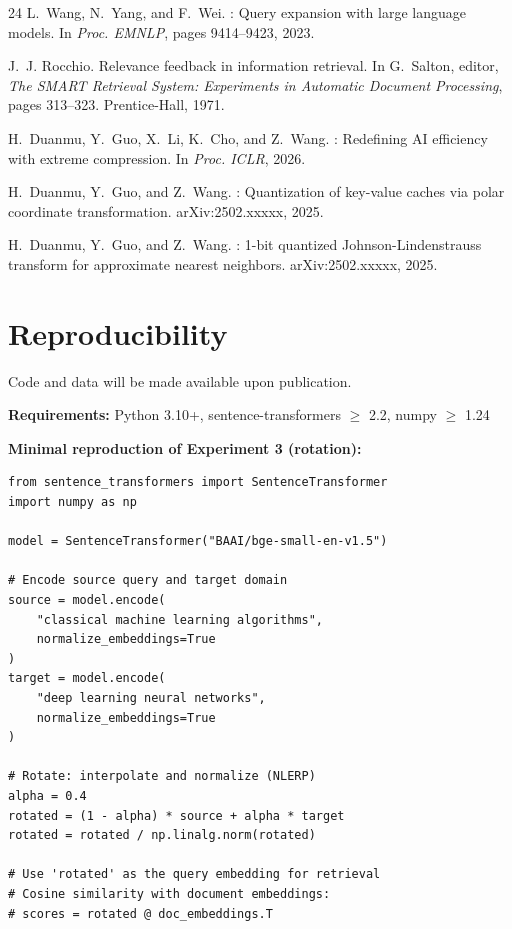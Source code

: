 \documentclass{article}
\begin{document}
\begin{thebibliography}{24}
L.~Wang, N.~Yang, and F.~Wei.
: Query expansion with large language models.
\newblock In \emph{Proc. EMNLP}, pages 9414--9423, 2023.

J.~J. Rocchio.
\newblock Relevance feedback in information retrieval.
\newblock In G.~Salton, editor, \emph{The {SMART} Retrieval System: Experiments in Automatic Document Processing}, pages 313--323. Prentice-Hall, 1971.

H.~Duanmu, Y.~Guo, X.~Li, K.~Cho, and Z.~Wang.
: Redefining {AI} efficiency with extreme compression.
\newblock In \emph{Proc. ICLR}, 2026.

H.~Duanmu, Y.~Guo, and Z.~Wang.
: Quantization of key-value caches via polar coordinate transformation.
\newblock arXiv:2502.xxxxx, 2025.

H.~Duanmu, Y.~Guo, and Z.~Wang.
: 1-bit quantized {Johnson-Lindenstrauss} transform for approximate nearest neighbors.
\newblock arXiv:2502.xxxxx, 2025.

\end{thebibliography}

\appendix

\section{Reproducibility}

Code and data will be made available upon publication.

\textbf{Requirements:} Python 3.10+, sentence-transformers $\geq$ 2.2, numpy $\geq$ 1.24

\textbf{Minimal reproduction of Experiment 3 (rotation):}

\begin{Verbatim}[fontsize=\small]
from sentence_transformers import SentenceTransformer
import numpy as np

model = SentenceTransformer("BAAI/bge-small-en-v1.5")

# Encode source query and target domain
source = model.encode(
    "classical machine learning algorithms",
    normalize_embeddings=True
)
target = model.encode(
    "deep learning neural networks",
    normalize_embeddings=True
)

# Rotate: interpolate and normalize (NLERP)
alpha = 0.4
rotated = (1 - alpha) * source + alpha * target
rotated = rotated / np.linalg.norm(rotated)

# Use 'rotated' as the query embedding for retrieval
# Cosine similarity with document embeddings:
# scores = rotated @ doc_embeddings.T
\end{Verbatim}
\end{document}
